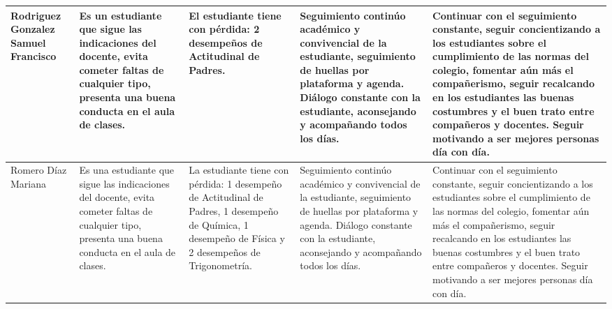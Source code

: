 \documentclass[spanish,11pt,a4paper]{article}
\begin{document}
\begin{longtable}{|p{3.5cm}|p{3.5cm}|p{3.5cm}|p{3.5cm}|p{3.5cm}|}
		Rodriguez Gonzalez Samuel Francisco & 
		Es un estudiante que sigue las indicaciones del docente, evita cometer faltas de cualquier tipo, presenta una buena conducta en el aula de clases. & 
		El estudiante tiene con pérdida: 2 desempeños de Actitudinal de Padres. & 
		Seguimiento continúo académico y convivencial de la estudiante, seguimiento de huellas por plataforma y agenda. Diálogo constante con la estudiante, aconsejando y acompañando todos los días. & 
		Continuar con el seguimiento constante, seguir concientizando a los estudiantes sobre el cumplimiento de las normas del colegio, fomentar aún más el compañerismo, seguir recalcando en los estudiantes las buenas costumbres y el buen trato entre compañeros y docentes. Seguir motivando a ser mejores personas día con día.\\
		\hline
		
		Romero Díaz Mariana & 
		Es una estudiante que sigue las indicaciones del docente, evita cometer faltas de cualquier tipo, presenta una buena conducta en el aula de clases. & 
		La estudiante tiene con pérdida: 1 desempeño de Actitudinal de Padres, 1 desempeño de Química, 1 desempeño de Física y 2 desempeños de Trigonometría. & 
		Seguimiento continúo académico y convivencial de la estudiante, seguimiento de huellas por plataforma y agenda. Diálogo constante con la estudiante, aconsejando y acompañando todos los días. & 
		Continuar con el seguimiento constante, seguir concientizando a los estudiantes sobre el cumplimiento de las normas del colegio, fomentar aún más el compañerismo, seguir recalcando en los estudiantes las buenas costumbres y el buen trato entre compañeros y docentes. Seguir motivando a ser mejores personas día con día.\\
		\hline
		
	\end{longtable}
	
\end{document}
